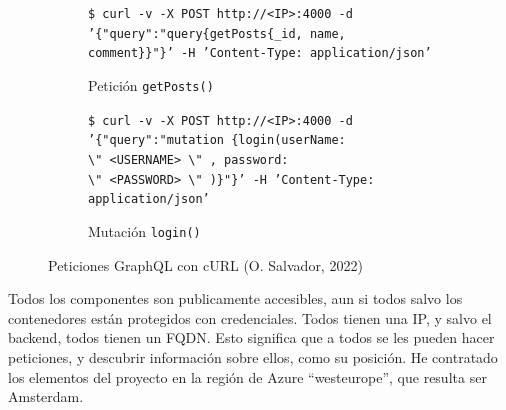 \documentclass[11pt]{article}
\begin{document}
\begin{flushleft}
		\begin{figure}[htb]
			\centering
			\begin{subfigure}{\textwidth}
				\footnotesize
				\texttt{\$ curl -v -X POST http://<IP>:4000 -d '\{"query":"query\{getPosts\{\_id, name, comment\}\}"\}' -H 'Content-Type: application/json'} 
				\caption{Petición \texttt{getPosts()}}
			\end{subfigure}
			\linebreak
			
			\begin{subfigure}{\textwidth}
				\begin{subfigure}{\textwidth}
				\centering
				\end{subfigure}
				\linebreak
				\footnotesize
				\texttt{\$ curl -v -X POST http://<IP>:4000 -d '\{"query":"mutation \{login(userName: \textbackslash"\ <USERNAME>\ \textbackslash"\ , password: \textbackslash"\ <PASSWORD>\ \textbackslash "\ )\}"\}' -H 'Content-Type: application/json'} 
				\caption{Mutación \texttt{login()}}
			\end{subfigure}
			\linebreak
			
			\caption{Peticiones GraphQL con cURL (O. Salvador, 2022)}
		\end{figure}
	
	\clearpage
	Todos los componentes son publicamente accesibles, aun si todos salvo los contenedores están protegidos con credenciales. Todos tienen una IP, y salvo el backend, todos tienen un FQDN. Esto significa que a todos se les pueden hacer peticiones, y descubrir información sobre ellos, como su posición. He contratado los elementos del proyecto en la región de Azure ``westeurope'', que resulta ser Amsterdam.
	

\end{flushleft}
\end{document}
